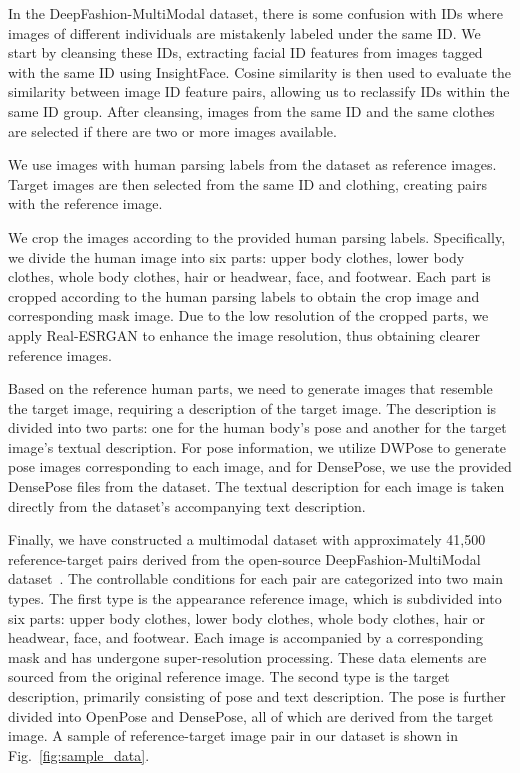 In the DeepFashion-MultiModal dataset, there is some confusion with IDs where images of different individuals are mistakenly labeled under the same ID. We start by cleansing these IDs, extracting facial ID features from images tagged with the same ID using InsightFace\cite{deng2018arcface, InsightFaceProject}. Cosine similarity is then used to evaluate the similarity between image ID feature pairs, allowing us to reclassify IDs within the same ID group. After cleansing, images from the same ID and the same clothes are selected if there are two or more images available.

We use images with human parsing labels from the dataset as reference images. Target images are then selected from the same ID and clothing, creating pairs with the reference image.

We crop the images according to the provided human parsing labels. Specifically, we divide the human image into six parts: upper body clothes, lower body clothes, whole body clothes, hair or headwear, face, and footwear. Each part is cropped according to the human parsing labels to obtain the crop image and corresponding mask image. Due to the low resolution of the cropped parts, we apply Real-ESRGAN\cite{wang2021realesrgan} to enhance the image resolution, thus obtaining clearer reference images.

Based on the reference human parts, we need to generate images that resemble the target image, requiring a description of the target image. The description is divided into two parts: one for the human body's pose and another for the target image's textual description. For pose information, we utilize DWPose\cite{yang2023dwpose} to generate pose images corresponding to each image, and for DensePose, we use the provided DensePose files from the dataset. The textual description for each image is taken directly from the dataset's accompanying text description.

Finally, we have constructed a multimodal dataset with approximately 41,500 reference-target pairs derived from the open-source DeepFashion-MultiModal dataset~\cite{jiang2022text2human,liuLQWTcvpr16DeepFashion}. The controllable conditions for each pair are categorized into two main types. The first type is the appearance reference image, which is subdivided into six parts: upper body clothes, lower body clothes, whole body clothes, hair or headwear, face, and footwear. Each image is accompanied by a corresponding mask and has undergone super-resolution processing. These data elements are sourced from the original reference image. The second type is the target description, primarily consisting of pose and text description. The pose is further divided into OpenPose and DensePose, all of which are derived from the target image. A sample of reference-target image pair in our dataset is shown in Fig.~\ref{fig:sample_data}.


